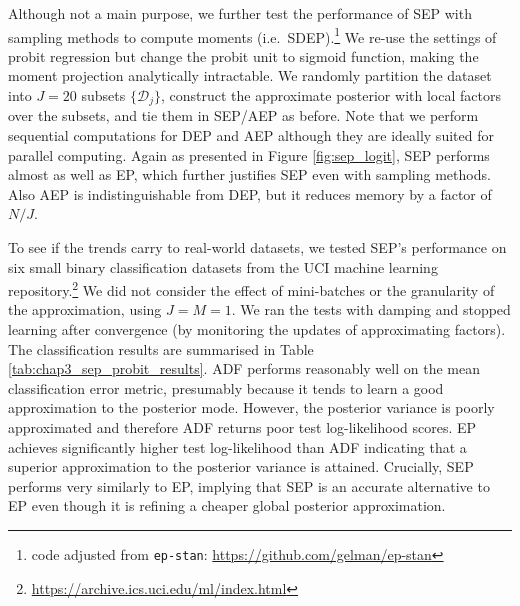 Although not a main purpose, we further test the performance of SEP with sampling methods to compute moments (i.e.~SDEP).\footnote{code adjusted from \texttt{ep-stan}: \url{https://github.com/gelman/ep-stan}} We re-use the settings of probit regression but change the probit unit to sigmoid function, making the moment projection analytically intractable. We randomly partition the dataset into $J = 20$ subsets $\{\mathcal{D}_j\}$, construct the approximate posterior with local factors over the subsets, and tie them in SEP/AEP as before. Note that we perform sequential computations for DEP and AEP although they are ideally suited for parallel computing. Again as presented in Figure \ref{fig:sep_logit}, SEP performs almost as well as EP, which further justifies SEP even with sampling methods. Also AEP is indistinguishable from DEP, but it reduces memory by a factor of $N/J$.

To see if the trends carry to real-world datasets, we tested SEP's performance on six small binary classification datasets from the UCI machine learning repository.\footnote{\url{https://archive.ics.uci.edu/ml/index.html}} We did not consider the effect of mini-batches or the granularity of the approximation, using $J=M=1$. We ran the tests with damping and stopped learning after convergence (by monitoring the updates of approximating factors). The classification results are summarised in Table \ref{tab:chap3_sep_probit_results}. ADF performs reasonably well on the mean classification error metric, presumably because it tends to learn a good approximation to the posterior mode. However, the posterior variance is poorly approximated and therefore ADF returns poor test log-likelihood scores. EP achieves significantly higher test log-likelihood than ADF indicating that a superior approximation to the posterior variance is attained. Crucially, SEP performs very similarly to EP, implying that SEP is an accurate alternative to EP even though it is refining a cheaper global posterior approximation.

